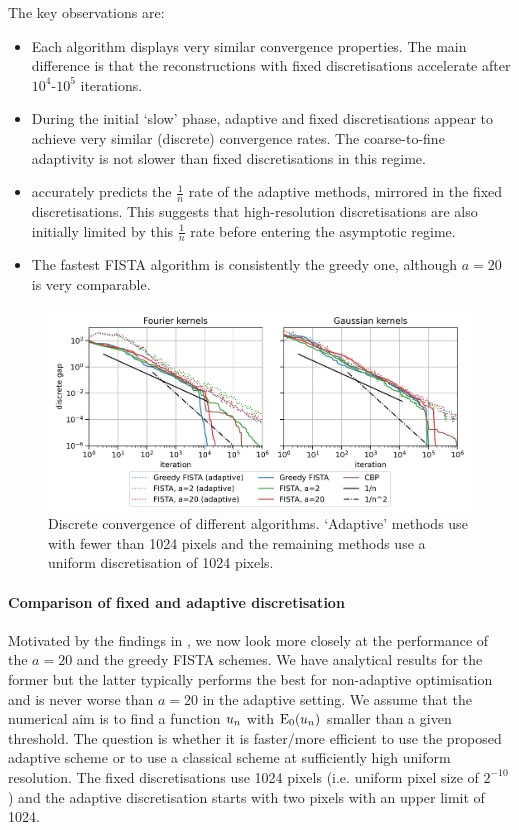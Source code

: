 \documentclass[10pt,a4paper,onecolumn]{article}
\numberwithin{equation}{section}
\newcommand{\op}[1]{\operatorname{#1}}\newcommand{\overtext}[2]{\stackrel{\text{#1}}{#2}}
\newcommand*{\Func}[1]{%
	\IfEqCase{#1}{%
		{0}{\op{E}}%
		{1}{\op{F}}%
		{2}{\op{G}}%
		{3}{\op{H}}%
	}[\op{F}#1]%
}
\newcommand*{\varf}[1]{%
	\IfEqCase{#1}{%
		{0}{u}%
		{1}{v}%
		{2}{w}%
	}[u#1]%
}
\begin{document}
The key observations are:
\begin{itemize}
	\item Each algorithm displays very similar convergence properties. The main difference is that the reconstructions with fixed discretisations accelerate after $10^4$-$10^5$ iterations.
	\item During the initial `slow' phase, adaptive and fixed discretisations appear to achieve very similar (discrete) convergence rates. The coarse-to-fine adaptivity is not slower than fixed discretisations in this regime.
	\item {} accurately predicts the $\frac1n$ rate of the adaptive methods, mirrored in the fixed discretisations. This suggests that high-resolution discretisations are also initially limited by this $\frac1n$ rate before entering the asymptotic regime.
	\item The fastest FISTA algorithm is consistently the greedy one, although $a=20$ is very comparable.
\end{itemize}

\begin{figure}[H]\centering
	\includegraphics[width=.84\textwidth]{lasso_convergence_short}
	\caption{Discrete convergence of different algorithms. `Adaptive' methods use  with fewer than 1024 pixels and the remaining methods use a uniform discretisation of 1024 pixels.}\label{fig: convergence with method}
\end{figure}

\paragraph{Comparison of fixed and adaptive discretisation}
Motivated by the findings in , we now look more closely at the performance of the $a=20$ and the greedy FISTA schemes. We have analytical results for the former but the latter typically performs the best for non-adaptive optimisation and is never worse than $a=20$ in the adaptive setting. We assume that the numerical aim is to find a function $\varf0_n$ with $\Func0_0(\varf0_n)$ smaller than a given threshold. The question is whether it is faster/more efficient to use the proposed adaptive scheme or to use a classical scheme at sufficiently high uniform resolution. The fixed discretisations use 1024 pixels (i.e. uniform pixel size of $2^{-10}$) and the adaptive discretisation starts with two pixels with an upper limit of 1024. 
\end{document}
